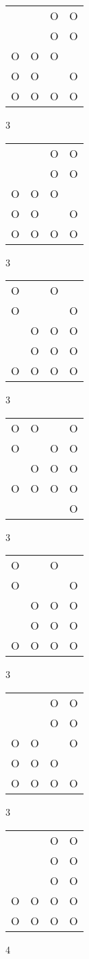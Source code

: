 \begin{tabular}{|m{0.2cm}m{0.2cm}m{0.2cm}m{0.2cm}|}\hline
 & &O&O\\
 & &O&O\\
O&O&O& \\
O&O& &O\\
O&O&O&O\\
\hline\end{tabular}3
\begin{tabular}{|m{0.2cm}m{0.2cm}m{0.2cm}m{0.2cm}|}\hline
 & &O&O\\
 & &O&O\\
O&O&O& \\
O&O& &O\\
O&O&O&O\\
\hline\end{tabular}3
\begin{tabular}{|m{0.2cm}m{0.2cm}m{0.2cm}m{0.2cm}|}\hline
O& &O& \\
O& & &O\\
 &O&O&O\\
 &O&O&O\\
O&O&O&O\\
\hline\end{tabular}3
\begin{tabular}{|m{0.2cm}m{0.2cm}m{0.2cm}m{0.2cm}|}\hline
O&O& &O\\
O& &O&O\\
 &O&O&O\\
O&O&O&O\\
 & & &O\\
\hline\end{tabular}3
\begin{tabular}{|m{0.2cm}m{0.2cm}m{0.2cm}m{0.2cm}|}\hline
O& &O& \\
O& & &O\\
 &O&O&O\\
 &O&O&O\\
O&O&O&O\\
\hline\end{tabular}3
\begin{tabular}{|m{0.2cm}m{0.2cm}m{0.2cm}m{0.2cm}|}\hline
 & &O&O\\
 & &O&O\\
O&O& &O\\
O&O&O& \\
O&O&O&O\\
\hline\end{tabular}3
\begin{tabular}{|m{0.2cm}m{0.2cm}m{0.2cm}m{0.2cm}|}\hline
 & &O&O\\
 & &O&O\\
 & &O&O\\
O&O&O&O\\
O&O&O&O\\
\hline\end{tabular}4
